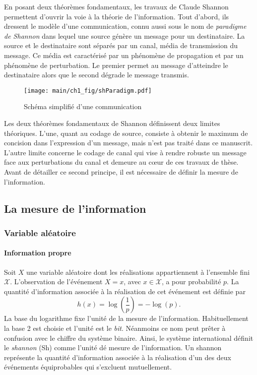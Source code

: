 En posant deux théorèmes fondamentaux, les travaux de Claude Shannon permettent d'ouvrir la voie à la théorie de 
l'information. Tout d'abord, ils dressent le modèle d'une communication, connu aussi sous le nom de 
\emph{paradigme de Shannon} dans lequel une source génère un message pour un destinataire. La source et le 
destinataire sont séparés par un canal, média de transmission du message. 
Ce média est caractérisé par un phénomène de propagation et par un phénomène de perturbation. Le premier permet au message 
d'atteindre le destinataire alors que le second dégrade le message transmis.

\begin{figure}[!h]
	\centering
	\texttt{[image: main/ch1\_fig/shParadigm.pdf]}
	\caption{\label{fig:paradigme} Schéma simplifié d'une communication}
\end{figure}


Les deux théorèmes fondamentaux de Shannon définissent deux limites théoriques. L'une, quant au codage de source, 
consiste à obtenir le maximum de concision dans l'expression d'un message, mais n'est pas traité dans ce manuscrit. 
L'autre limite concerne le codage de canal qui vise à rendre robuste un message face aux perturbations du canal et demeure au 
cœur de ces travaux de thèse. Avant de détailler ce second principe, il est nécessaire de définir la mesure de l'information.
\subsection{La mesure de l'information}
\subsubsection{Variable aléatoire}
\paragraph*{Information propre}
Soit $X$ une variable aléatoire dont les réalisations appartiennent à l'ensemble fini $\mathcal{X}$. L'observation de 
l'événement $X=x$, avec $x\in \mathcal{X}$, a pour probabilité $p$. La quantité d'information associée à la réalisation
de cet événement est définie par \[h(x)=\log(\frac{1}{p})=-\log(p).\]
La base du logarithme fixe l'unité de la mesure de l'information. Habituellement la base 2 est
choisie et l'unité est le \emph{bit}. Néanmoins ce nom peut prêter à confusion avec le chiffre du système binaire. 
Ainsi, le système international \cite{ISO} définit le \emph{shannon} (Sh) comme l'unité dé mesure de l'information. Un shannon 
représente la quantité d’information associée à la réalisation d'un des deux événements équiprobables qui s’excluent 
mutuellement. 

